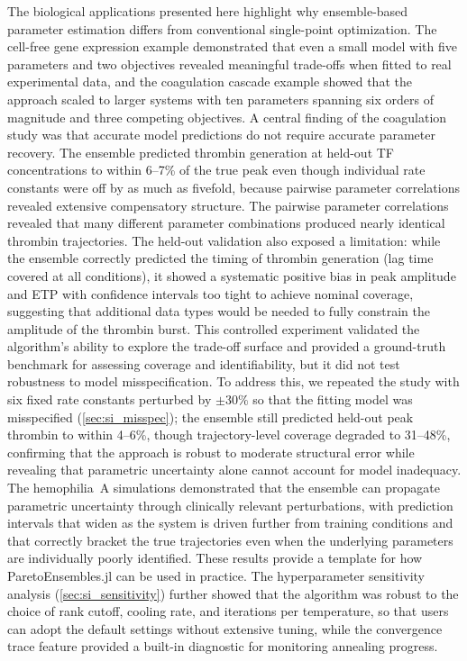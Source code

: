 \documentclass[preprint,review,12pt]{elsarticle}
\begin{document}
The biological applications presented here highlight why ensemble-based parameter estimation differs from conventional single-point optimization. The cell-free gene expression example demonstrated that even a small model with five parameters and two objectives revealed meaningful trade-offs when fitted to real experimental data, and the coagulation cascade example showed that the approach scaled to larger systems with ten parameters spanning six orders of magnitude and three competing objectives. A central finding of the coagulation study was that accurate model predictions do not require accurate parameter recovery. The ensemble predicted thrombin generation at held-out TF concentrations to within 6--7\% of the true peak even though individual rate constants were off by as much as fivefold, because pairwise parameter correlations revealed extensive compensatory structure. The pairwise parameter correlations revealed that many different parameter combinations produced nearly identical thrombin trajectories. The held-out validation also exposed a limitation: while the ensemble correctly predicted the timing of thrombin generation (lag time covered at all conditions), it showed a systematic positive bias in peak amplitude and ETP with confidence intervals too tight to achieve nominal coverage, suggesting that additional data types would be needed to fully constrain the amplitude of the thrombin burst. This controlled experiment validated the algorithm's ability to explore the trade-off surface and provided a ground-truth benchmark for assessing coverage and identifiability, but it did not test robustness to model misspecification. To address this, we repeated the study with six fixed rate constants perturbed by $\pm 30\%$ so that the fitting model was misspecified (\cref{sec:si_misspec}); the ensemble still predicted held-out peak thrombin to within 4--6\%, though trajectory-level coverage degraded to 31--48\%, confirming that the approach is robust to moderate structural error while revealing that parametric uncertainty alone cannot account for model inadequacy. The hemophilia~A simulations demonstrated that the ensemble can propagate parametric uncertainty through clinically relevant perturbations, with prediction intervals that widen as the system is driven further from training conditions and that correctly bracket the true trajectories even when the underlying parameters are individually poorly identified. These results provide a template for how ParetoEnsembles.jl can be used in practice. The hyperparameter sensitivity analysis (\cref{sec:si_sensitivity}) further showed that the algorithm was robust to the choice of rank cutoff, cooling rate, and iterations per temperature, so that users can adopt the default settings without extensive tuning, while the convergence trace feature provided a built-in diagnostic for monitoring annealing progress.
\end{document}

